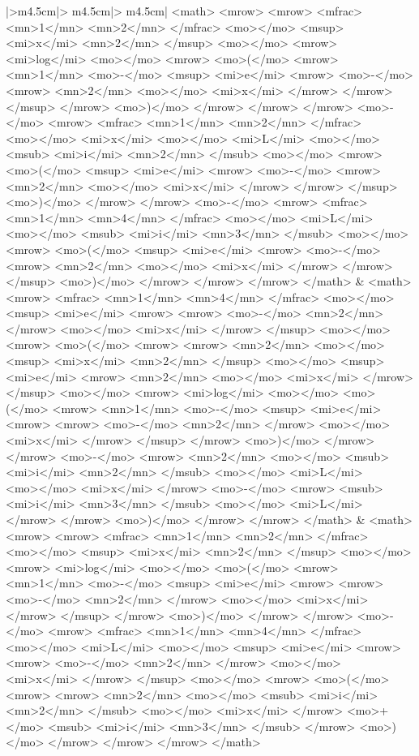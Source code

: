 \begin{tabular}{|>{\centering\arraybackslash}m{4.5cm}|>
{\centering\arraybackslash}m{4.5cm}|>
{\centering\arraybackslash}m{4.5cm}|}
\scriptsize{\codefont <math> <mrow> <mrow> <mfrac> <mn>1</mn> <mn>2</mn> </mfrac> <mo>⁢</mo> <msup> <mi>x</mi> <mn>2</mn> </msup> <mo>⁢</mo> <mrow> <mi>log</mi> <mo>⁡</mo> <mrow> <mo>(</mo> <mrow> <mn>1</mn> <mo>-</mo> <msup> <mi>e</mi> <mrow> <mo>-</mo> <mrow> <mn>2</mn> <mo>⁢</mo> <mi>x</mi> </mrow> </mrow> </msup> </mrow> <mo>)</mo> </mrow> </mrow> </mrow> <mo>-</mo> <mrow> <mfrac> <mn>1</mn> <mn>2</mn> </mfrac> <mo>⁢</mo> <mi>x</mi> <mo>⁢</mo> <mi>L</mi> <mo>⁢</mo> <msub> <mi>i</mi> <mn>2</mn> </msub> <mo>⁢</mo> <mrow> <mo>(</mo> <msup> <mi>e</mi> <mrow> <mo>-</mo> <mrow> <mn>2</mn> <mo>⁢</mo> <mi>x</mi> </mrow> </mrow> </msup> <mo>)</mo> </mrow> </mrow> <mo>-</mo> <mrow> <mfrac> <mn>1</mn> <mn>4</mn> </mfrac> <mo>⁢</mo> <mi>L</mi> <mo>⁢</mo> <msub> <mi>i</mi> <mn>3</mn> </msub> <mo>⁢</mo> <mrow> <mo>(</mo> <msup> <mi>e</mi> <mrow> <mo>-</mo> <mrow> <mn>2</mn> <mo>⁢</mo> <mi>x</mi> </mrow> </mrow> </msup> <mo>)</mo> </mrow> </mrow> </mrow> </math> }      & \scriptsize{\codefont <math> <mrow> <mfrac> <mn>1</mn> <mn>4</mn> </mfrac> <mo>⁢</mo> <msup> <mi>e</mi> <mrow> <mrow> <mo>-</mo> <mn>2</mn> </mrow> <mo>⁢</mo> <mi>x</mi> </mrow> </msup> <mo>⁢</mo> <mrow> <mo>(</mo> <mrow> <mrow> <mn>2</mn> <mo>⁢</mo> <msup> <mi>x</mi> <mn>2</mn> </msup> <mo>⁢</mo> <msup> <mi>e</mi> <mrow> <mn>2</mn> <mo>⁢</mo> <mi>x</mi> </mrow> </msup> <mo>⁢</mo> <mrow> <mi>log</mi> <mo>⁡</mo> <mo>(</mo> <mrow> <mn>1</mn> <mo>-</mo> <msup> <mi>e</mi> <mrow> <mrow> <mo>-</mo> <mn>2</mn> </mrow> <mo>⁢</mo> <mi>x</mi> </mrow> </msup> </mrow> <mo>)</mo> </mrow> </mrow> <mo>-</mo> <mrow> <mn>2</mn> <mo>⁢</mo> <msub> <mi>i</mi> <mn>2</mn> </msub> <mo>⁢</mo> <mi>L</mi> <mo>⁢</mo> <mi>x</mi> </mrow> <mo>-</mo> <mrow> <msub> <mi>i</mi> <mn>3</mn> </msub> <mo>⁢</mo> <mi>L</mi> </mrow> </mrow> <mo>)</mo> </mrow> </mrow> </math> }    & \scriptsize{\codefont <math> <mrow> <mrow> <mfrac> <mn>1</mn> <mn>2</mn> </mfrac> <mo>⁢</mo> <msup> <mi>x</mi> <mn>2</mn> </msup> <mo>⁢</mo> <mrow> <mi>log</mi> <mo>⁡</mo> <mo>(</mo> <mrow> <mn>1</mn> <mo>-</mo> <msup> <mi>e</mi> <mrow> <mrow> <mo>-</mo> <mn>2</mn> </mrow> <mo>⁢</mo> <mi>x</mi> </mrow> </msup> </mrow> <mo>)</mo> </mrow> </mrow> <mo>-</mo> <mrow> <mfrac> <mn>1</mn> <mn>4</mn> </mfrac> <mo>⁢</mo> <mi>L</mi> <mo>⁢</mo> <msup> <mi>e</mi> <mrow> <mrow> <mo>-</mo> <mn>2</mn> </mrow> <mo>⁢</mo> <mi>x</mi> </mrow> </msup> <mo>⁢</mo> <mrow> <mo>(</mo> <mrow> <mrow> <mn>2</mn> <mo>⁢</mo> <msub> <mi>i</mi> <mn>2</mn> </msub> <mo>⁢</mo> <mi>x</mi> </mrow> <mo>+</mo> <msub> <mi>i</mi> <mn>3</mn> </msub> </mrow> <mo>)</mo> </mrow> </mrow> </mrow> </math>}     \\ 

\end{tabular}
